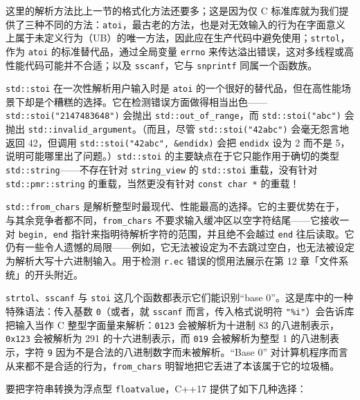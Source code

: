这里的解析方法比上一节的格式化方法还要多；这是因为仅 C 标准库就为我们提供了三种不同的方法：\texttt{atoi}，最古老的方法，也是对无效输入的行为在字面意义上属于未定义行为（UB）的唯一方法，因此应在生产代码中避免使用；\texttt{strtol}，作为 \texttt{atoi} 的标准替代品，通过全局变量 \texttt{errno} 来传达溢出错误，这对多线程或高性能代码可能并不合适；以及 \texttt{sscanf}，它与 \texttt{snprintf} 同属一个函数族。

\texttt{std::\allowbreak{}stoi} 在一次性解析用户输入时是 \texttt{atoi} 的一个很好的替代品，但在高性能场景下却是个糟糕的选择。它在检测错误方面做得相当出色——\texttt{std::\allowbreak{}stoi(\allowbreak{}"2147483648")\allowbreak{}} 会抛出 \texttt{std::\allowbreak{}out\_\allowbreak{}of\_\allowbreak{}range}，而 \texttt{std::\allowbreak{}stoi(\allowbreak{}"abc")\allowbreak{}} 会抛出 \texttt{std::\allowbreak{}invalid\_\allowbreak{}argument}。（而且，尽管 \texttt{std::\allowbreak{}stoi(\allowbreak{}"42abc")\allowbreak{}} 会毫无怨言地返回 42，但调用 \texttt{std::\allowbreak{}stoi(\allowbreak{}"42abc",\allowbreak{} \&endidx)\allowbreak{}} 会把 \texttt{endidx} 设为 2 而不是 5，说明可能哪里出了问题。）\texttt{std::\allowbreak{}stoi} 的主要缺点在于它只能作用于确切的类型 \texttt{std::\allowbreak{}string}——不存在针对 \texttt{string\_\allowbreak{}view} 的 \texttt{std::\allowbreak{}stoi} 重载，没有针对 \texttt{std::\allowbreak{}pmr::\allowbreak{}string} 的重载，当然更没有针对 \texttt{const char *} 的重载！

\texttt{std::\allowbreak{}from\_\allowbreak{}chars} 是解析整型时最现代、性能最高的选择。它的主要优势在于，与其余竞争者都不同，\texttt{from\_\allowbreak{}chars} 不要求输入缓冲区以空字符结尾——它接收一对 \texttt{begin,\allowbreak{} end} 指针来指明待解析字符的范围，并且绝不会越过 \texttt{end} 往后读取。它仍有一些令人遗憾的局限——例如，它无法被设定为不去跳过空白，也无法被设定为解析大写十六进制输入。用于检测 \texttt{r.\allowbreak{}ec} 错误的惯用法展示在第 12 章「文件系统」的开头附近。

\texttt{strtol}、\texttt{sscanf} 与 \texttt{stoi} 这几个函数都表示它们能识别“base 0”。这是库中的一种特殊语法：传入基数 \texttt{0}（或者，就 \texttt{sscanf} 而言，传入格式说明符 \texttt{"\%i"}）会告诉库把输入当作 C 整型字面量来解析：\texttt{0123} 会被解析为十进制 83 的八进制表示，\texttt{0x123} 会被解析为 291 的十六进制表示，而 \texttt{019} 会被解析为整型 1 的八进制表示，字符 \texttt{9} 因为不是合法的八进制数字而未被解析。“Base 0” 对计算机程序而言从来都不是合适的行为，\texttt{from\_\allowbreak{}chars} 明智地把它丢进了本该属于它的垃圾桶。

要把字符串转换为浮点型 \texttt{floatvalue}，C++17 提供了如下几种选择：

